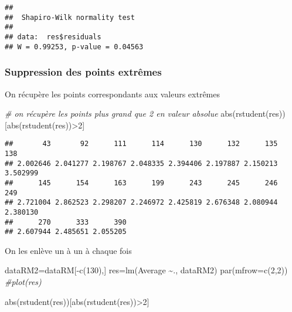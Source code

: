 \documentclass[
]{article}
\newenvironment{Shaded}{\begin{snugshade}}{\end{snugshade}}
\newcommand{\AttributeTok}[1]{\textcolor[rgb]{0.77,0.63,0.00}{#1}}
\newcommand{\CommentTok}[1]{\textcolor[rgb]{0.56,0.35,0.01}{\textit{#1}}}
\newcommand{\DecValTok}[1]{\textcolor[rgb]{0.00,0.00,0.81}{#1}}
\newcommand{\FunctionTok}[1]{\textcolor[rgb]{0.00,0.00,0.00}{#1}}
\newcommand{\NormalTok}[1]{#1}
\newcommand{\OtherTok}[1]{\textcolor[rgb]{0.56,0.35,0.01}{#1}}
\newcommand{\SpecialCharTok}[1]{\textcolor[rgb]{0.00,0.00,0.00}{#1}}
\begin{document}
\begin{verbatim}
## 
##  Shapiro-Wilk normality test
## 
## data:  res$residuals
## W = 0.99253, p-value = 0.04563
\end{verbatim}

\hypertarget{suppression-des-points-extruxeames}{%
\subsubsection{Suppression des points
extrêmes}\label{suppression-des-points-extruxeames}}

On récupère les points correspondants aux valeurs extrêmes

\begin{Shaded}
\begin{Highlighting}[]
\CommentTok{\# on récupère les points plus grand que 2 en valeur absolue}
\FunctionTok{abs}\NormalTok{(}\FunctionTok{rstudent}\NormalTok{(res))[}\FunctionTok{abs}\NormalTok{(}\FunctionTok{rstudent}\NormalTok{(res))}\SpecialCharTok{\textgreater{}}\DecValTok{2}\NormalTok{]}
\end{Highlighting}
\end{Shaded}

\begin{verbatim}
##       43       92      111      114      130      132      135      138 
## 2.002646 2.041277 2.198767 2.048335 2.394406 2.197887 2.150213 3.502999 
##      145      154      163      199      243      245      246      249 
## 2.721004 2.862523 2.298207 2.246972 2.425819 2.676348 2.080944 2.380130 
##      270      333      390 
## 2.607944 2.485651 2.055205
\end{verbatim}

On les enlève un à un à chaque fois

\begin{Shaded}
\begin{Highlighting}[]
\NormalTok{dataRM2}\OtherTok{=}\NormalTok{dataRM[}\SpecialCharTok{{-}}\FunctionTok{c}\NormalTok{(}\DecValTok{130}\NormalTok{),]}
\NormalTok{res}\OtherTok{=}\FunctionTok{lm}\NormalTok{(Average }\SpecialCharTok{\textasciitilde{}}\NormalTok{., dataRM2)}
\FunctionTok{par}\NormalTok{(}\AttributeTok{mfrow=}\FunctionTok{c}\NormalTok{(}\DecValTok{2}\NormalTok{,}\DecValTok{2}\NormalTok{))}
\CommentTok{\#plot(res)}
\end{Highlighting}
\end{Shaded}

\begin{Shaded}
\begin{Highlighting}[]
\FunctionTok{abs}\NormalTok{(}\FunctionTok{rstudent}\NormalTok{(res))[}\FunctionTok{abs}\NormalTok{(}\FunctionTok{rstudent}\NormalTok{(res))}\SpecialCharTok{\textgreater{}}\DecValTok{2}\NormalTok{]}
\end{Highlighting}
\end{Shaded}
\end{document}
